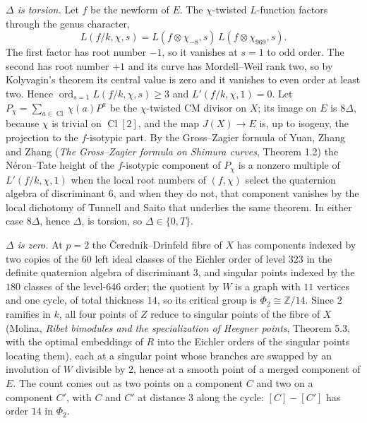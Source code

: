 \documentclass[11pt,reqno]{amsart}
\theoremstyle{plain}
\theoremstyle{definition}
\DeclareMathOperator{\Cl}{Cl}
\DeclareMathOperator{\ord}{ord}
\newcommand{\Z}{\mathbb{Z}}
\begin{document}
\emph{$\Delta$ is torsion.} Let $f$ be the newform of $E$. The $\chi$-twisted $L$-function factors through
the genus character,
\[
L(f/k,\chi,s)=L(f\otimes\chi_{-8},s)\,L(f\otimes\chi_{969},s).
\]
The first factor has root number $-1$, so it vanishes at $s=1$ to odd order. The second has root number $+1$
and its curve has Mordell--Weil rank two, so by Kolyvagin's theorem its central value is zero and it vanishes
to even order at least two. Hence $\ord_{s=1}L(f/k,\chi,s)\ge3$ and $L'(f/k,\chi,1)=0$. Let $P_\chi=\sum_{a\in
\Cl}\chi(a)P^a$ be the $\chi$-twisted CM divisor on $X$; its image on $E$ is $8\Delta$, because $\chi$ is
trivial on $\Cl[2]$, and the map $J(X)\to E$ is, up to isogeny, the projection to the $f$-isotypic part. By the
Gross--Zagier formula of Yuan, Zhang and Zhang (\emph{The Gross--Zagier formula on Shimura curves}, Theorem
1.2) the N\'eron--Tate height of the $f$-isotypic component of $P_\chi$ is a nonzero multiple of
$L'(f/k,\chi,1)$ when the local root numbers of $(f,\chi)$ select the quaternion algebra of discriminant $6$,
and when they do not, that component vanishes by the local dichotomy of Tunnell and Saito that underlies the
same theorem. In either case $8\Delta$, hence $\Delta$, is torsion, so $\Delta\in\{0,T\}$.

\emph{$\Delta$ is zero.} At $p=2$ the \v{C}erednik--Drinfeld fibre of $X$ has components indexed by two
copies of the $60$ left ideal classes of the Eichler order of level $323$ in the definite quaternion algebra
of discriminant $3$, and singular points indexed by the $180$ classes of the level-$646$ order; the quotient
by $W$ is a graph with $11$ vertices and one cycle, of total thickness $14$, so its critical group is
$\Phi_2\cong\Z/14$. Since $2$ ramifies in $k$, all four points of $Z$ reduce to singular points of the fibre
of $X$ (Molina, \emph{Ribet bimodules and the specialization of Heegner points}, Theorem 5.3, with the
optimal embeddings of $R$ into the Eichler orders of the singular points locating them), each at a singular
point whose branches are swapped by an involution of $W$ divisible by $2$, hence at a smooth point of a merged
component of $E$. The count comes out as two points on a component $C$ and two on a component $C'$, with $C$
and $C'$ at distance $3$ along the cycle: $[C]-[C']$ has order $14$ in $\Phi_2$.
\end{document}
